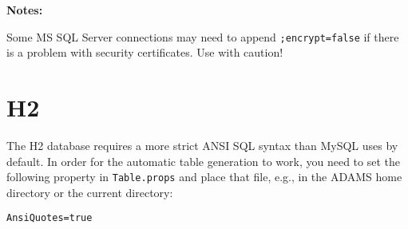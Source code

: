 \documentclass[a4paper]{book}
\begin{document}
\noindent \textbf{Notes:}
\begin{tight_itemize}
    \item Some MS SQL Server connections may need to append \texttt{;encrypt=false} if there is a problem with
    security certificates. Use with caution!
\end{tight_itemize}

\clearpage
\section{H2}
The H2 database requires a more strict ANSI SQL syntax than MySQL uses by default.
In order for the automatic table generation to work, you need to set the following property
in \texttt{Table.props} and place that file, e.g., in the ADAMS home directory or the current directory:
\begin{verbatim}
AnsiQuotes=true
\end{verbatim}


\end{document}
